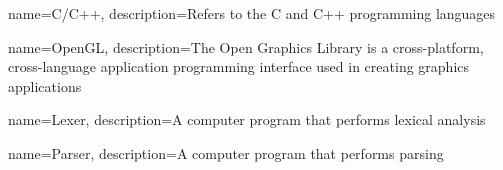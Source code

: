 {
	name=C/C++, 
	description={Refers to the C and C++ programming languages}
}

{
	name=OpenGL, 
	description={The Open Graphics Library is a cross-platform, cross-language application programming interface used in creating graphics applications}
}

{
	name=Lexer, 
	description={A computer program that performs lexical analysis}
}

{
	name=Parser,
	description={A computer program that performs parsing}
}

